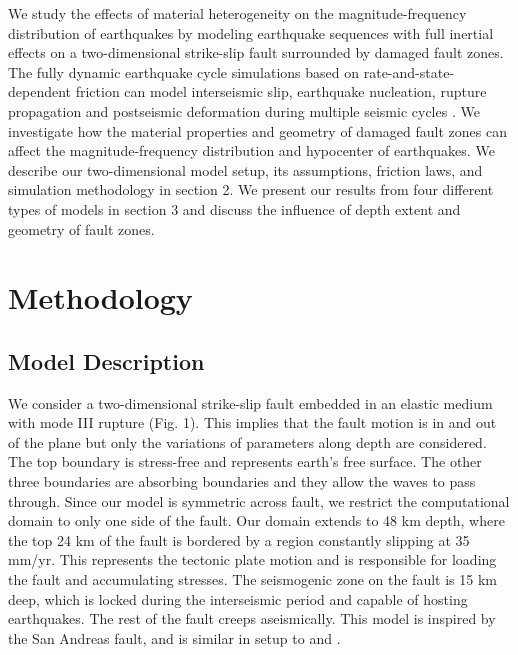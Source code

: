 \documentclass[11pt]{article}
\begin{document}
We study the effects of material heterogeneity on the magnitude-frequency distribution of earthquakes by modeling earthquake sequences with full inertial effects on a two-dimensional strike-slip fault surrounded by damaged fault zones. The fully dynamic earthquake cycle simulations based on rate-and-state-dependent friction can model interseismic slip, earthquake nucleation, rupture propagation and postseismic deformation during multiple seismic cycles \citep{lapusta_2000; kaneko_2011; barbot_2012; jiang_lapusta_2016}. We investigate how the material properties and geometry of damaged fault zones can affect the magnitude-frequency distribution and hypocenter of earthquakes. We describe our two-dimensional model setup, its assumptions, friction laws, and simulation methodology in section 2. We present our results from four different types of models in section 3 and discuss the influence of depth extent and geometry of fault zones.



\section{Methodology}
\subsection{Model Description}
We consider a two-dimensional strike-slip fault embedded in an elastic medium with mode III rupture (Fig. 1). This implies that the fault motion is in and out of the plane but only the variations of parameters along depth are considered. The top boundary is stress-free and represents earth’s free surface. The other three boundaries are absorbing boundaries and they allow the waves to pass through. Since our model is symmetric across fault, we restrict the computational domain to only one side of the fault. Our domain extends to 48 km depth, where the top 24 km of the fault is bordered by a region constantly slipping at 35 mm/yr. This represents the tectonic plate motion and is responsible for loading the fault and accumulating stresses. The seismogenic zone on the fault is 15 km deep, which is locked during the interseismic period and capable of hosting earthquakes. The rest of the fault creeps aseismically. This model is inspired by the San Andreas fault, and is similar in setup to \citet{lapusta_2000} and \citet{kaneko_2011}.
\end{document}
